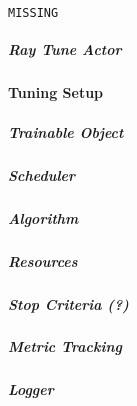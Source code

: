 \begin{lstlisting}[language=Python, caption=\acrshort{cam2} Interface, captionpos=b, label={lst:cam2_interface}]
MISSING
\end{lstlisting}

\subparagraph{Ray Tune Actor}

\paragraph{Tuning Setup}

\subparagraph{Trainable Object}
\subparagraph{Scheduler}
\subparagraph{Algorithm}
\subparagraph{Resources}
\subparagraph{Stop Criteria (?)}
\subparagraph{Metric Tracking}
\subparagraph{Logger}
